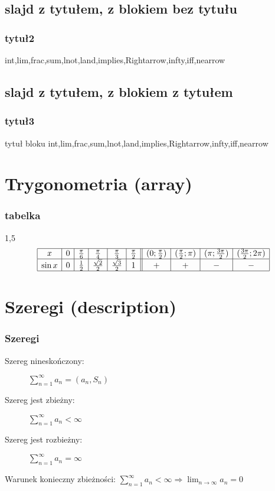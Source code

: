 \documentclass{beamer}
\begin{document}
\subsection{slajd z tytułem, z blokiem bez tytułu}
\begin{frame}
	\frametitle{tytuł2}
	\begin{block}{}
		int,lim,frac,sum,lnot,land,implies,Rightarrow,infty,iff,nearrow
	\end{block}
\end{frame}

\subsection{slajd z tytułem, z blokiem z tytułem}
\begin{frame}
	\frametitle{tytuł3}
	\begin{block}{tytuł bloku}
		int,lim,frac,sum,lnot,land,implies,Rightarrow,infty,iff,nearrow
	\end{block}
\end{frame}


\section{Trygonometria (array)}

\begin{frame}
	\frametitle{tabelka}

	\begin{spacing}{1,5}
	\[
		\begin{array}{|c|c|c|c|c|c||c|c|c|c|}
			\hline
			x & 0 & \frac{\pi}{6} & \frac{\pi}{4} & \frac{\pi}{3} & \frac{\pi}{2} &
			(0; \frac{\pi}{2}) & (\frac{\pi}{2};\pi) & (\pi;\frac{3\pi}{2}) & (\frac{3\pi}{2}; 2\pi)\\
			\hline
			\sin x & 0 & \frac{1}{2} & \frac{\sqrt{2}}{2} & \frac{\sqrt{3}}{2} & 1 & + & + & - & -\\
			\hline
		\end{array}
	\]
	\end{spacing}
\end{frame}


\section{Szeregi (description)}

\begin{frame}
	\frametitle{Szeregi}

	\begin{description}
		\item[Szereg nineskończony:] $\displaystyle \sum_{n=1}^\infty a_n = (a_n, S_n)$
		\item[Szereg jest zbieżny:] $\displaystyle \sum_{n=1}^\infty a_n < \infty$
		\item[Szereg jest rozbieżny:] $\displaystyle \sum_{n=1}^\infty a_n = \infty$
	\end{description}

	\noindent Warunek konieczny zbieżności: $\displaystyle \sum_{n=1}^\infty a_n < \infty \Rightarrow \lim_{n \to \infty} a_n = 0$ \\

\end{frame}
\end{document}
